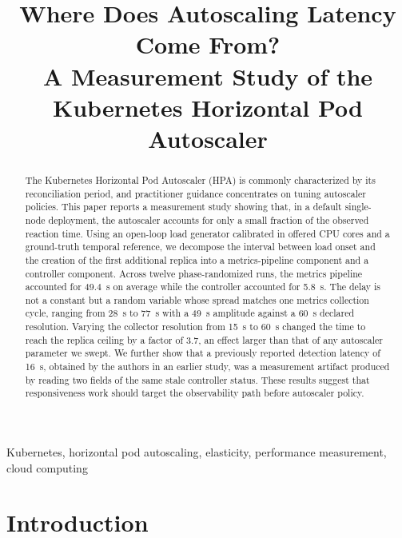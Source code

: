 \documentclass[conference]{IEEEtran}
\begin{document}
\title{Where Does Autoscaling Latency Come From?\\
A Measurement Study of the Kubernetes Horizontal Pod Autoscaler}

\author{
}

\maketitle

\begin{abstract}
The Kubernetes Horizontal Pod Autoscaler (HPA) is commonly characterized by its
reconciliation period, and practitioner guidance concentrates on tuning
autoscaler policies. This paper reports a measurement study showing that, in a
default single-node deployment, the autoscaler accounts for only a small
fraction of the observed reaction time. Using an open-loop load generator
calibrated in offered CPU cores and a ground-truth temporal reference, we
decompose the interval between load onset and the creation of the first
additional replica into a metrics-pipeline component and a controller
component. Across twelve phase-randomized runs, the metrics pipeline accounted
for 49.4~s on average while the controller accounted for 5.8~s. The delay is
not a constant but a random variable whose spread matches one metrics
collection cycle, ranging from 28~s to 77~s with a 49~s amplitude against a
60~s declared resolution. Varying the collector resolution from 15~s to 60~s
changed the time to reach the replica ceiling by a factor of 3.7, an effect
larger than that of any autoscaler parameter we swept. We further show that a
previously reported detection latency of 16~s, obtained by the authors in an
earlier study, was a measurement artifact produced by reading two fields of the
same stale controller status. These results suggest that responsiveness work
should target the observability path before autoscaler policy.
\end{abstract}

\begin{IEEEkeywords}
Kubernetes, horizontal pod autoscaling, elasticity, performance measurement,
cloud computing
\end{IEEEkeywords}

\section{Introduction}
\end{document}
